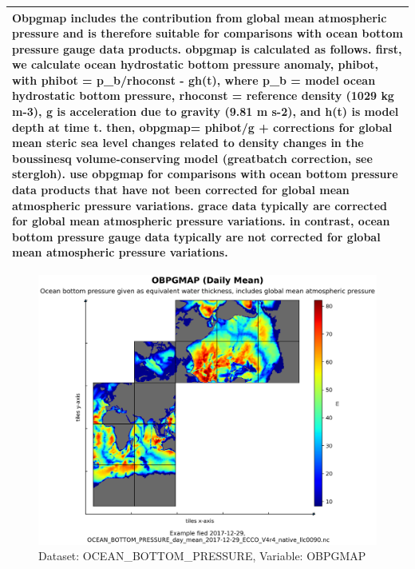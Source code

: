 \begin{longtable}{|m{}|m{}|m{}|m{}|}
\multicolumn{4}{|p{1\textwidth}|}{Obpgmap includes the contribution from global mean atmospheric pressure and is therefore suitable for comparisons with ocean bottom pressure gauge data products. obpgmap is calculated as follows. first, we calculate ocean hydrostatic bottom pressure anomaly, phibot, with phibot = p\_b/rhoconst - gh(t), where p\_b = model ocean hydrostatic bottom pressure, rhoconst = reference density (1029 kg m-3), g is acceleration due to gravity (9.81 m s-2), and h(t) is model depth at time t. then, obpgmap= phibot/g + corrections for global mean steric sea level changes related to density changes in the boussinesq volume-conserving model (greatbatch correction, see stergloh). use obpgmap for comparisons with ocean bottom pressure data products that have not been corrected for global mean atmospheric pressure variations. grace data typically are corrected for global mean atmospheric pressure variations. in contrast, ocean bottom pressure gauge data typically are not corrected for global mean atmospheric pressure variations.} \\ \hline
\end{longtable}

\begin{figure}[H]
\centering
\includegraphics[scale=0.55]{../images/plots/native_plots/Ocean_Bottom_Pressure/OBPGMAP.png}
\caption{Dataset: OCEAN\_BOTTOM\_PRESSURE, Variable: OBPGMAP}
\label{tab:table-OCEAN_BOTTOM_PRESSURE_OBPGMAP-Plot}
\end{figure}
\pagebreak
